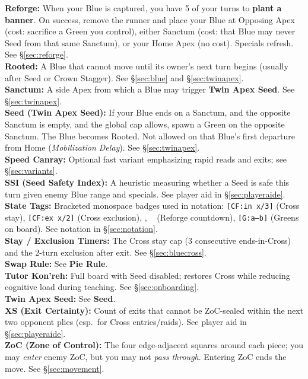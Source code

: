 \documentclass[11pt]{article}
\newcommand{\RoC}{\textcolor{teal!60!black}{\scriptsize\ttfamily[Rooted]}}
\newcommand{\RC}{\textcolor{purple!70!black}{\scriptsize\ttfamily[RC]}}
\renewcommand{\RC}[1][]{%
  \textcolor{purple!70!black}{\scriptsize\ttfamily[RC%
  \if\relax\detokenize{#1}\relax\else~#1\fi]}}
\begin{document}
\textbf{Reforge:} When your Blue is captured, you have 5 of your turns to \textbf{plant a banner}. On success, remove the runner and place your Blue at Opposing Apex (cost: sacrifice a Green you control), either Sanctum (cost: that Blue may never Seed from that same Sanctum), or your Home Apex (no cost). Specials refresh. See \S\ref{sec:reforge}.\\

\textbf{Rooted:} A Blue that cannot move until its owner's next turn begins (usually after Seed or Crown Stagger). See \S\ref{sec:blue} and \S\ref{sec:twinapex}.\\

\textbf{Sanctum:} A side Apex from which a Blue may trigger \textbf{Twin Apex Seed}. See \S\ref{sec:twinapex}.\\

\textbf{Seed (Twin Apex Seed):} If your Blue ends on a Sanctum, and the opposite Sanctum is empty, and the global cap allows, spawn a Green on the opposite Sanctum. The Blue becomes Rooted. Not allowed on that Blue's first departure from Home (\emph{Mobilization Delay}). See \S\ref{sec:twinapex}.\\

\textbf{Speed Canray:} Optional fast variant emphasizing rapid reads and exits; see \S\ref{sec:variants}.\\

\textbf{SSI (Seed Safety Index):} A heuristic measuring whether a Seed is safe this turn given enemy Blue range and specials. See player aid in \S\ref{sec:playeraide}.\\

\textbf{State Tags:} Bracketed monospace badges used in notation: \texttt{[CF:in x/3]} (Cross stay), \texttt{[CF:ex x/2]} (Cross exclusion), \texttt{\RoC}, \texttt{\RC[3/5]} (Reforge countdown), \texttt{[G:a--b]} (Greens on board). See notation in \S\ref{sec:notation}.\\

\textbf{Stay / Exclusion Timers:} The Cross stay cap (3 consecutive ends-in-Cross) and the 2-turn exclusion after exit. See \S\ref{sec:bluecross}.\\

\textbf{Swap Rule:} See \textbf{Pie Rule}.\\

\textbf{Tutor Kon'reh:} Full board with Seed disabled; restores Cross while reducing cognitive load during teaching. See \S\ref{sec:onboarding}.\\

\textbf{Twin Apex Seed:} See \textbf{Seed}.\\

\textbf{XS (Exit Certainty):} Count of exits that cannot be ZoC-sealed within the next two opponent plies (esp.\ for Cross entries/raids). See player aid in \S\ref{sec:playeraide}.\\

\textbf{ZoC (Zone of Control):} The four edge-adjacent squares around each piece; you may \emph{enter} enemy ZoC, but you may not \emph{pass through}. Entering ZoC ends the move. See \S\ref{sec:movement}.\\
\end{document}
